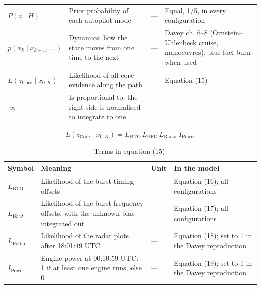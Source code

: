 \begin{table}[h]
\begin{tabular}{p{2.4cm}p{4.6cm}p{1.1cm}p{4.0cm}}
$P(a \mid H)$ & Prior probability of each autopilot mode & — & Equal, 1/5, in every configuration \\
$p(x_{k} \mid x_{k-1},\, \ldots)$ & Dynamics: how the state moves from one time to the next & — & Davey ch. 6–8 (Ornstein–Uhlenbeck cruise, manoeuvres), plus fuel burn when used \\
$L(z_{\mathrm{Core}} \mid x_{0:K})$ & Likelihood of all core evidence along the path & — & Equation (15) \\
$\propto$ & Is proportional to; the right side is normalised to integrate to one & — & — \\
\hline
\end{tabular}
\end{table}

\begin{equation}
L\left(z_{\mathrm{Core}} \mid x_{0:K}\right) = L_{\mathrm{BTO}}\, L_{\mathrm{BFO}}\, L_{\mathrm{Radar}}\, I_{\mathrm{Power}}
\label{eq:15}
\end{equation}
\begin{table}[h]
\caption{Terms in equation (15).}
\small
\begin{tabular}{p{2.4cm}p{4.6cm}p{1.1cm}p{4.0cm}}
\hline
Symbol & Meaning & Unit & In the model \\
\hline
$L_{\mathrm{BTO}}$ & Likelihood of the burst timing offsets & — & Equation (16); all configurations \\
$L_{\mathrm{BFO}}$ & Likelihood of the burst frequency offsets, with the unknown bias integrated out & — & Equation (17); all configurations \\
$L_{\mathrm{Radar}}$ & Likelihood of the radar plots after 18:01:49 UTC & — & Equation (18); set to 1 in the Davey reproduction \\
$I_{\mathrm{Power}}$ & Engine power at 00:10:59 UTC: 1 if at least one engine runs, else 0 & — & Equation (19); set to 1 in the Davey reproduction \\
\hline
\end{tabular}
\end{table}

